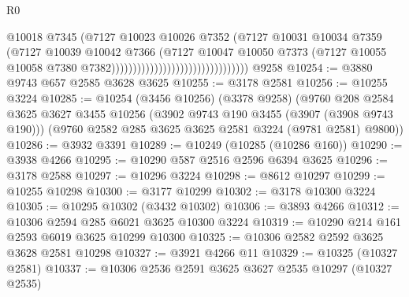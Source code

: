\begin{lexlean}{R0}
\begin{coremodule}
                                                          @10018
                                                          @7345
                                                          (@7127
                                                            @10023
                                                            @10026
                                                            @7352
                                                            (@7127
                                                              @10031
                                                              @10034
                                                              @7359
                                                              (@7127
                                                                @10039
                                                                @10042
                                                                @7366
                                                                (@7127
                                                                  @10047
                                                                  @10050
                                                                  @7373
                                                                  (@7127
                                                                    @10055
                                                                    @10058
                                                                    @7380
                                                                    @7382))))))))))))))))))))))))))))))))
    @9258
@10254 := @3880 @9743 @657 @2585 @3628 @3625
@10255 := @3178 @2581
@10256 := @10255 @3224
@10285 := @10254
    (@3456 @10256)
    (@3378 @9258)
    (@9760
      @208
      @2584
      @3625
      @3627
      @3455
      @10256
      (@3902 @9743 @190 @3455 (@3907 (@3908 @9743 @190)))
      (@9760 @2582 @285 @3625 @3625 @2581 @3224 (@9781 @2581) @9800))
@10286 := @3932 @3391
@10289 := @10249 (@10285 (@10286 @160))
@10290 := @3938 @4266
@10295 := @10290 @587 @2516 @2596 @6394 @3625
@10296 := @3178 @2588
@10297 := @10296 @3224
@10298 := @8612 @10297
@10299 := @10255 @10298
@10300 := @3177 @10299
@10302 := @3178 @10300 @3224
@10305 := @10295 @10302 (@3432 @10302)
@10306 := @3893 @4266
@10312 := @10306 @2594 @285 @6021 @3625 @10300 @3224
@10319 := @10290 @214 @161 @2593 @6019 @3625 @10299 @10300
@10325 := @10306 @2582 @2592 @3625 @3628 @2581 @10298
@10327 := @3921 @4266 @11
@10329 := @10325 (@10327 @2581)
@10337 := @10306 @2536 @2591 @3625 @3627 @2535 @10297 (@10327 @2535)

\end{coremodule}
\end{lexlean}
